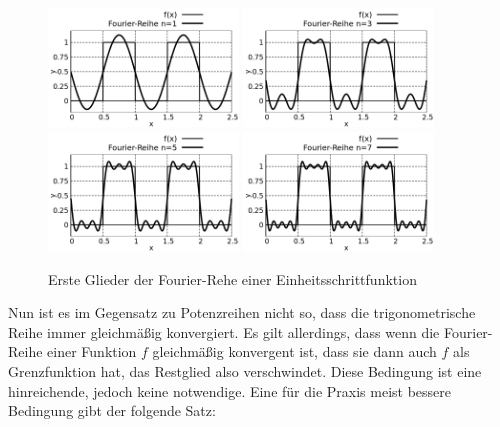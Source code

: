 \begin{figure}
    \centering
    \includegraphics[width=0.45\textwidth]{./gnuplot/fourier-transform-step-1}
    \includegraphics[width=0.45\textwidth]{./gnuplot/fourier-transform-step-2}
    \includegraphics[width=0.45\textwidth]{./gnuplot/fourier-transform-step-3}
    \includegraphics[width=0.45\textwidth]{./gnuplot/fourier-transform-step-4}
    \caption{Erste Glieder der Fourier-Rehe einer Einheitsschrittfunktion}
    \label{fig:ExUnitStepFourier}
\end{figure}

Nun ist es im Gegensatz zu Potenzreihen nicht so, dass die trigonometrische Reihe immer gleichmäßig konvergiert. Es gilt allerdings, dass wenn die Fourier-Reihe einer Funktion $f$ gleichmäßig konvergent ist, dass sie dann auch $f$ als Grenzfunktion hat, das Restglied also verschwindet. Diese Bedingung ist eine hinreichende, jedoch keine notwendige. Eine für die Praxis meist bessere Bedingung gibt der folgende Satz:

